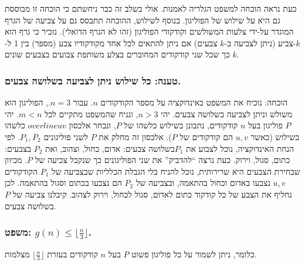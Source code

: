 \documentclass[
]{book}
\begin{document}
כעת נראה הוכחה למשפט הגלריה לאמנות. אולי בשלב זה כבר ניחשתם כי הוכחה זו מבוססת גם היא על שילוש של הפוליגון. בנוסף לשילוש, ההוכחה תתבסס גם על צביעה של הגרף המוגדר על-ידי צלעות המשולשים וקודקודי הפוליגון (זהו לא הגרף הדואלי). נזכיר כי גרף הוא \(k\)-צביע (ניתן לצביעה ב-\(k\) צבעים) אם ניתן להתאים לכל אחד מקודקודיו צבע (מספר) בין 1 ל-\(k\) כך שכל שני קודקודים המחוברים בצלע משותפת צבועים בצבעים שונים.

\hypertarget{ux5d8ux5e2ux5e0ux5d4-ux5dbux5dc-ux5e9ux5d9ux5dcux5d5ux5e9-ux5e0ux5d9ux5eaux5df-ux5dcux5e6ux5d1ux5d9ux5e2ux5d4-ux5d1ux5e9ux5dcux5d5ux5e9ux5d4-ux5e6ux5d1ux5e2ux5d9ux5dd.}{%
\subsubsection*{טענה: כל שילוש ניתן לצביעה בשלושה צבעים.}\label{ux5d8ux5e2ux5e0ux5d4-ux5dbux5dc-ux5e9ux5d9ux5dcux5d5ux5e9-ux5e0ux5d9ux5eaux5df-ux5dcux5e6ux5d1ux5d9ux5e2ux5d4-ux5d1ux5e9ux5dcux5d5ux5e9ux5d4-ux5e6ux5d1ux5e2ux5d9ux5dd.}}

הוכחה: נוכיח את המשפט באינדוקציה על מספר הקודקודים \(n\). עבור \(n=3\)., הפוליגון הוא משולש וניתן לצביעה בשלושה צבעים. יהי \(n> 3\), ונניח שהמשפט מתקיים לכל \(m<n\). יהי \(P\) פוליגון בעל \(n\) קודקודים, נתבונן בשילוש כלשהו של \(P\), ונבחר אלכסון \(overline{u v}\) כלשהו בשילוש (כאשר \(u,v\) הם קודקודים של \(P\)). אלכסון זה מחלק את \(P\) לשני פוליגונים \(P_1,P_2\). לפי הנחת האינדוקציה, נוכל לצבוע את \(P_1\)בשלושה צבעים: אדום, כחול, וצהוב, ואת \(P_2\) בצבעים: כתום, סגול, וירוק. כעת נרצה ``להדביק'' את שני הפוליגונים כך שנקבל צכיעה של \(P\). מכיוון שבחירת הצבעים היא שרירותית, נוכל להניח בלי הגבלת הכלליות שבצביעה של \(P_1\) הקודקודים \(u,v\) נצבעו באדום וכחול בהתאמה, ובצביעה של \(P_2\) הם נצבעו בכתום וסגול בהתאמה. לכן נחליף את הצבע של כל קודקוד כתום לאדום, סגול לכחול, וירוק לצהוב. קיבלנו צביעה של \(P\) בשלושה צבעים.

\hypertarget{ux5deux5e9ux5e4ux5d8-gnle-lfloor-fracn3-rfloor.}{%
\subsubsection*{\texorpdfstring{משפט: \(g(n)\le \lfloor \frac{n}{3} \rfloor\).}{משפט: g(n)\textbackslash le \textbackslash lfloor \textbackslash frac\{n\}\{3\} \textbackslash rfloor.}}\label{ux5deux5e9ux5e4ux5d8-gnle-lfloor-fracn3-rfloor.}}

כלומר, ניתן לשמור על כל פוליגון פשוט \(P\) בעל \(n\) קודקודים בעזרת \(\lfloor \frac{n}{3} \rfloor\) מצלמות.
\end{document}
